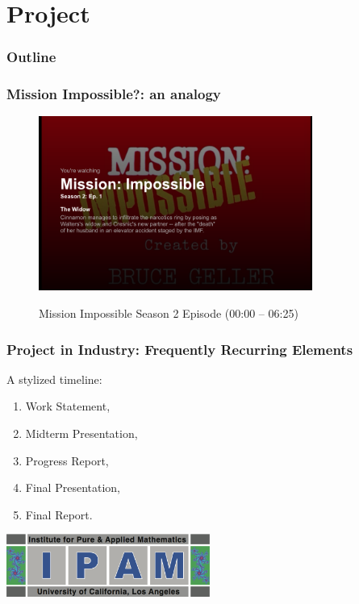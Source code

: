 \section{Project}

\begin{frame}
    \frametitle{Outline}
\end{frame}


\begin{frame}[fragile]
    \frametitle{Mission Impossible?: an analogy}
    \begin{figure}
        \caption{Mission Impossible Season 2 Episode (00:00 -- 06:25)}
    \begin{center}
    \href{http://movies.netflix.com/WiPlayer?movieid=70157337&trkid=4431095&pt_request_id=a8a7108c-c068-4d22-b649-0b7095279045-1882594&pt_rank=4&pt_row=-1&pt_location=WATCHNOW#MovieId=70157337&EpisodeMovieId=70156671}{
            \includegraphics[width=0.8\textwidth]{images/IMFproblemstatement.png}
    }
    \end{center}
    \end{figure}
\end{frame}

\begin{frame}
    \frametitle{Project in Industry: Frequently Recurring Elements}
    A stylized timeline:
    \vspace{7pt}
             \begin{enumerate}
                 \item Work Statement,
                 \item Midterm Presentation,
                 \item Progress Report,
                 \item Final Presentation,
                 \item Final Report.
             \end{enumerate}
    \begin{center}
        \href{http://www.ipam.ucla.edu/programs/rips2011/}{
        \includegraphics[width=0.5\textwidth]{images/ipam}}        
    \end{center}
\end{frame}

